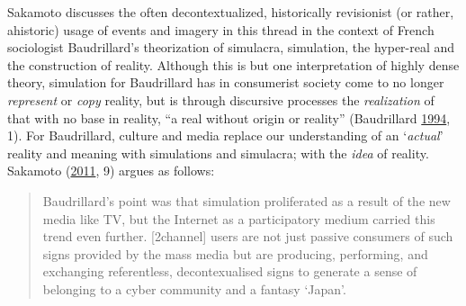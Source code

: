 \documentclass[10pt,british,A4paper,oneside]{memoir}
\begin{document}
Sakamoto discusses the often decontextualized, historically revisionist
(or rather, ahistoric) usage of events and imagery in this thread in the
context of French sociologist Baudrillard's theorization of simulacra,
simulation, the hyper-real and the construction of reality. Although
this is but one interpretation of highly dense theory, simulation for
Baudrillard has in consumerist society come to no longer
\emph{represent} or \emph{copy} reality, but is through discursive
processes the \emph{realization} of that with no base in reality, ``a
real without origin or reality'' (Baudrillard
\protect\hyperlink{ref-baudrillard_simulacra_1994}{1994}, 1). For
Baudrillard, culture and media replace our understanding of an
`\emph{actual}' reality and meaning with simulations and simulacra; with
the \emph{idea} of reality. Sakamoto
(\protect\hyperlink{ref-sakamoto_koreans_2011}{2011}, 9) argues as
follows:

\begin{quote}
Baudrillard's point was that simulation proliferated as a result of the
new media like TV, but the Internet as a participatory medium carried
this trend even further. {[}2channel{]} users are not just passive consumers of
such signs provided by the mass media but are producing, performing, and
exchanging referentless, decontexualised signs to generate a sense of
belonging to a cyber community and a fantasy `Japan'.
\end{quote}
\end{document}
